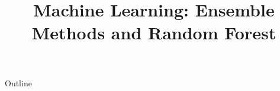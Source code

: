 \documentclass[xcolor=dvipsnames,compress,t,pdf,9pt]{beamer}
\title[\insertframenumber /\inserttotalframenumber]{Machine Learning: Ensemble Methods and Random Forest}
\begin{document}
	\begin{frame}
	\titlepage
	\end{frame}

	\begin{frame}{Outline}
	    \tableofcontents
	\end{frame}

	
	
	
\end{document}

